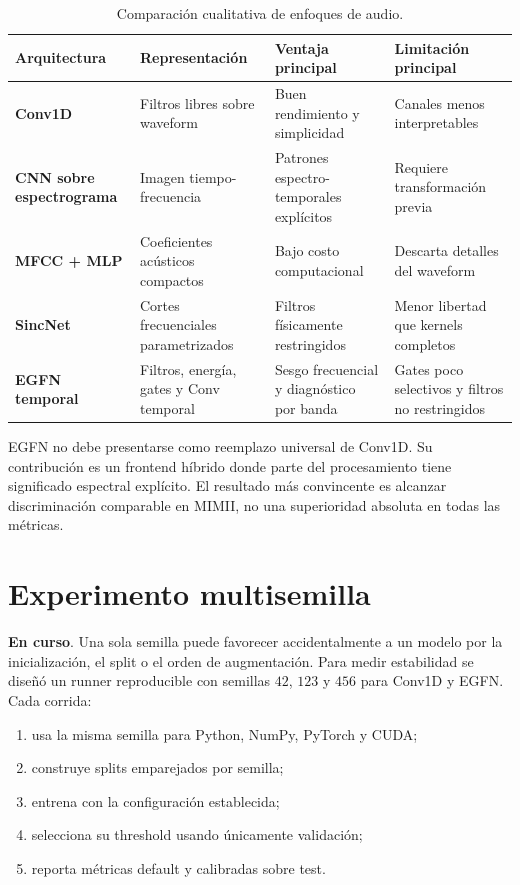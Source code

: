 \documentclass[11pt,a4paper]{article}
\newcommand{\pending}{\textcolor{egfnorange}{\textbf{En curso}}}
\begin{document}
\begin{table}[ht]
\centering
\caption{Comparación cualitativa de enfoques de audio.}
\label{tab:architectures}
\begin{tabularx}{\textwidth}{>{\bfseries}lXXX}
\toprule
Arquitectura & Representación & Ventaja principal & Limitación principal \\
\midrule
Conv1D & Filtros libres sobre waveform & Buen rendimiento y simplicidad & Canales menos interpretables \\
CNN sobre espectrograma & Imagen tiempo-frecuencia & Patrones espectro-temporales explícitos & Requiere transformación previa \\
MFCC + MLP & Coeficientes acústicos compactos & Bajo costo computacional & Descarta detalles del waveform \\
SincNet & Cortes frecuenciales parametrizados & Filtros físicamente restringidos & Menor libertad que kernels completos \\
EGFN temporal & Filtros, energía, gates y Conv temporal & Sesgo frecuencial y diagnóstico por banda & Gates poco selectivos y filtros no restringidos \\
\bottomrule
\end{tabularx}
\end{table}

EGFN no debe presentarse como reemplazo universal de Conv1D. Su contribución es
un frontend híbrido donde parte del procesamiento tiene significado espectral
explícito. El resultado más convincente es alcanzar discriminación comparable
en MIMII, no una superioridad absoluta en todas las métricas.

\section{Experimento multisemilla}

\pending. Una sola semilla puede favorecer accidentalmente a un modelo por la
inicialización, el split o el orden de augmentación. Para medir estabilidad se
diseñó un runner reproducible con semillas \(42\), \(123\) y \(456\) para
Conv1D y EGFN. Cada corrida:

\begin{enumerate}
  \item usa la misma semilla para Python, NumPy, PyTorch y CUDA;
  \item construye splits emparejados por semilla;
  \item entrena con la configuración establecida;
  \item selecciona su threshold usando únicamente validación;
  \item reporta métricas default y calibradas sobre test.
\end{enumerate}
\end{document}
